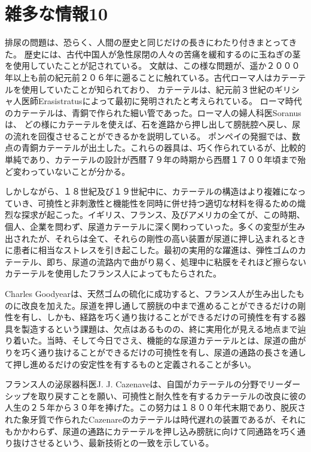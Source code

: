 \section{雑多な情報10}
排尿の問題は、恐らく、人間の歴史と同じだけの長きにわたり付きまとってきた。
歴史には、古代中国人が急性尿閉の人々の苦痛を緩和するのに玉ねぎの茎を使用していたことが記されている。
文献は、この様な問題が、遥か２０００年以上も前の紀元前２０６年に遡ることに触れている。古代ローマ人はカテーテルを使用していたことが知られており、
カテーテルは、紀元前３世紀のギリシャ人医師Erasistratusによって最初に発明されたと考えられている。
ローマ時代のカテーテルは、青銅で作られた細い管であった。ローマ人の婦人科医Soranusは、
どの様にカテーテルを使えば、石を進路から押し出して膀胱腔へ戻し、尿の流れを回復させることができるかを説明している。
ポンペイの発掘では、数点の青銅カテーテルが出土した。これらの器具は、巧く作られているが、比較的単純であり、カテーテルの設計が西暦７９年の時期から西暦１７００年頃まで殆ど変わっていないことが分かる。

しかしながら、１８世紀及び１９世紀中に、カテーテルの構造はより複雑になっていき、可撓性と非刺激性と機能性を同時に併せ持つ適切な材料を得るための熾烈な探求が起こった。イギリス、フランス、及びアメリカの全てが、この時期、個人、企業を問わず、尿道カテーテルに深く関わっていった。多くの変型が生み出されたが、それらは全て、それらの剛性の高い装置が尿道に押し込まれるときに患者に相当なストレスを引き起こした。最初の実用的な躍進は、弾性ゴムのカテーテル、即ち、尿道の流路内で曲がり易く、処理中に粘膜をそれほど擦らないカテーテルを使用したフランス人によってもたらされた。

Charles Goodyearは、天然ゴムの硫化に成功すると、フランス人が生み出したものに改良を加えた。尿道を押し通して膀胱の中まで進めることができるだけの剛性を有し、しかも、経路を巧く通り抜けることができるだけの可撓性を有する器具を製造するという課題は、欠点はあるものの、終に実用化が見える地点まで辿り着いた。当時、そして今日でさえ、機能的な尿道カテーテルとは、尿道の曲がりを巧く通り抜けることができるだけの可撓性を有し、尿道の通路の長さを通して押し進めるだけの安定性を有するものと定義されることが多い。

フランス人の泌尿器科医J. J. Cazenaveは、自国がカテーテルの分野でリーダーシップを取り戻すことを願い、可撓性と耐久性を有するカテーテルの改良に彼の人生の２５年から３０年を捧げた。この努力は１８００年代末期であり、脱灰された象牙質で作られたCazenareのカテーテルは時代遅れの装置であるが、それにもかかわらず、尿道の通路にカテーテルを押し込み膀胱に向けて同通路を巧く通り抜けさせるという、最新技術との一致を示している。

